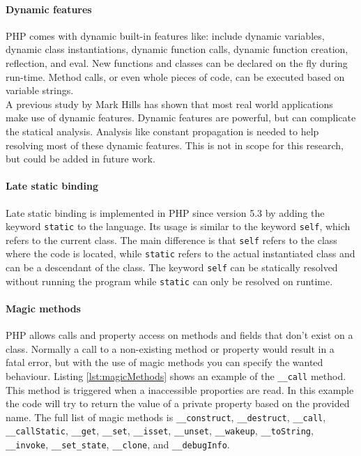\documentclass[../main.tex]{subfiles}
\begin{document}
    
    \paragraph{Dynamic features}
    PHP comes with dynamic built-in features like: include dynamic variables, dynamic class instantiations, dynamic function calls, dynamic function creation, reflection, and eval.
    New functions and classes can be declared on the fly during run-time.
    Method calls, or even whole pieces of code, can be executed based on variable strings.
    \\
    A previous study by Mark Hills\cite{Hil:13} has shown that most real world applications make use of dynamic features.
    Dynamic features are powerful, but can complicate the statical analysis.
    Analysis like constant propagation is needed to help resolving most of these dynamic features.
    This is not in scope for this research, but could be added in future work.
    
    \paragraph{Late static binding}
    Late static binding\footnotemark{} is implemented in PHP since version 5.3 by adding the keyword \texttt{static} to the language.
    Its usage is similar to the keyword \texttt{self}, which refers to the current class. 
    The main difference is that \texttt{self} refers to the class where the code is located, while \texttt{static} refers to the actual instantiated class and can be a descendant of the class.
    The keyword \texttt{self} can be statically resolved without running the program while \texttt{static} can only be resolved on runtime.
    
    \paragraph{Magic methods}
    PHP allows calls and property access on methods and fields that don't exist on a class.
    Normally a call to a non-existing method or property would result in a fatal error, but with the use of magic methods you can specify the wanted behaviour.
    Listing \ref{lst:magicMethods} shows an example of the \texttt{\_\_{}call} method.
    This method is triggered when a inaccessible proporties are read.
    In this example the code will try to return the value of a private property based on the provided name.
    The full list of magic methods is \texttt{\_\_{}construct}, \texttt{\_\_{}destruct}, \texttt{\_\_{}call}, \texttt{\_\_{}callStatic}, \texttt{\_\_{}get}, \texttt{\_\_{}set}, \texttt{\_\_{}isset}, \texttt{\_\_{}unset}, \texttt{\_\_{}wakeup}, \texttt{\_\_{}toString}, \texttt{\_\_{}invoke}, \texttt{\_\_{}set\_state}, \texttt{\_\_{}clone}, and \texttt{\_\_{}debugInfo}.
	
\end{document}
